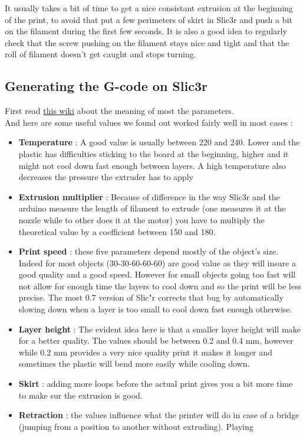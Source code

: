 \documentclass{article}
\begin{document}
It usually takes a bit of time to get a nice consistant extrusion at the beginning of the print, to avoid that put a few perimeters of skirt in Slic3r and push a bit on the filament during the first few seconds.
It is also a good idea to regularly check that the screw pushing on the filament stays nice and tight and that the roll of filament doesn't get caught and stops turning.

\subsection{Generating the G-code on Slic3r}

First read \href{http://richrap.blogspot.com/2012/01/slic3r-is-nicer-part-1-settings-and.html}{this wiki} about the meaning of most the parameters. \\

And here are some useful values we found out worked fairly well in most cases :
\begin{itemize}
\item \textbf{Temperature} : A good value is usually between 220 and 240. Lower and the plastic has difficulties sticking to the board at the beginning, higher and it might not cool down fast enough between layers. A high temperature also decreases the pressure the extruder has to apply
\item \textbf{Extrusion multiplier} : Because of difference in the way Slic3r and the arduino measure the length of filament to extrude (one measures it at the nozzle while to other does it at the motor) you have to multiply the theoretical value by a coefficient between 150 and 180.
\item \textbf{Print speed} : these five parameters depend mostly of the object's size. Indeed for most objects (30-30-60-60-60) are good value as they will insure a good quality and a good speed. However for small objects going too fast will not allow for enough time the layers to cool down and so the print will be less precise. The most 0.7 version of Slic"r corrects that bug by automatically slowing down when a layer is too small to cool down fast enough otherwise.
\item \textbf{Layer height} : The evident idea here is that a smaller layer height will make for a better quality. The values should be between 0.2 and 0.4 mm, however while 0.2 mm provides a very nice quality print it makes it longer and sometimes the plastic will bend more easily while cooling down.
\item \textbf{Skirt} : adding more loops before the actual print gives you a bit more time to make sur the extrusion is good.
\item \textbf{Retraction} : the values influence what the printer will do in case of a bridge (jumping from a position to another without extruding). Playing
\end{itemize}
\end{document}
